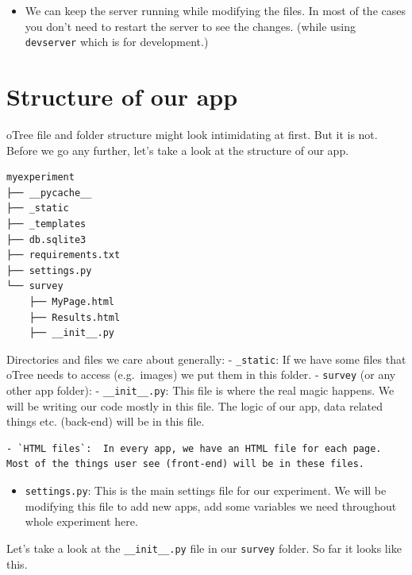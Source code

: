 \documentclass[
  letterpaper,
  DIV=11,
  numbers=noendperiod]{scrreprt}
\providecommand{\tightlist}{%
  \setlength{\itemsep}{0pt}\setlength{\parskip}{0pt}}\usepackage{longtable,booktabs,array}
\begin{document}
\begin{itemize}
\tightlist
\item
  We can keep the server running while modifying the files. In most of
  the cases you don't need to restart the server to see the changes.
  (while using \texttt{devserver} which is for development.)
\end{itemize}

\hypertarget{structure-of-our-app}{%
\section{Structure of our app}\label{structure-of-our-app}}

oTree file and folder structure might look intimidating at first. But it
is not. Before we go any further, let's take a look at the structure of
our app.

\begin{verbatim}
myexperiment
├── __pycache__
├── _static
├── _templates
├── db.sqlite3
├── requirements.txt
├── settings.py
└── survey
    ├── MyPage.html
    ├── Results.html
    ├── __init__.py
\end{verbatim}

Directories and files we care about generally: - \texttt{\_static}: If
we have some files that oTree needs to access (e.g.~images) we put them
in this folder. - \texttt{survey} (or any other app folder): -
\texttt{\_\_init\_\_.py}: This file is where the real magic happens. We
will be writing our code mostly in this file. The logic of our app, data
related things etc. (back-end) will be in this file.

\begin{verbatim}
- `HTML files`:  In every app, we have an HTML file for each page. Most of the things user see (front-end) will be in these files.
\end{verbatim}

\begin{itemize}
\tightlist
\item
  \texttt{settings.py}: This is the main settings file for our
  experiment. We will be modifying this file to add new apps, add some
  variables we need throughout whole experiment here.
\end{itemize}

Let's take a look at the \texttt{\_\_init\_\_.py} file in our
\texttt{survey} folder. So far it looks like this.
\end{document}
